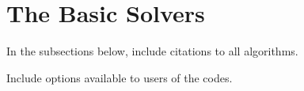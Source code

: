 \section{The Basic Solvers}\label{s:basic_solvers}

{\sf In the subsections below, include citations to all
algorithms.}

{\sf Include options available to users of the codes.}